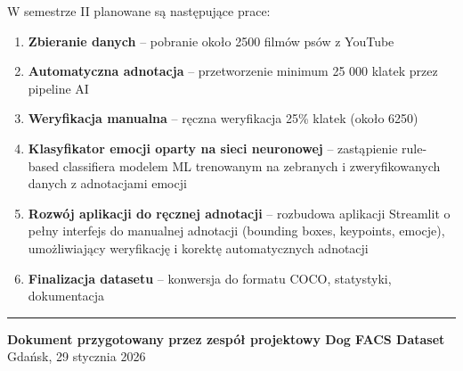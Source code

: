 \documentclass[12pt,a4paper]{article}
\begin{document}
W semestrze II planowane są następujące prace:

\begin{enumerate}
    \item \textbf{Zbieranie danych} -- pobranie około 2500 filmów psów z YouTube
    \item \textbf{Automatyczna adnotacja} -- przetworzenie minimum 25 000 klatek przez pipeline AI
    \item \textbf{Weryfikacja manualna} -- ręczna weryfikacja 25\% klatek (około 6250)
    \item \textbf{Klasyfikator emocji oparty na sieci neuronowej} -- zastąpienie rule-based classifiera modelem ML trenowanym na zebranych i zweryfikowanych danych z adnotacjami emocji
    \item \textbf{Rozwój aplikacji do ręcznej adnotacji} -- rozbudowa aplikacji Streamlit o pełny interfejs do manualnej adnotacji (bounding boxes, keypoints, emocje), umożliwiający weryfikację i korektę automatycznych adnotacji
    \item \textbf{Finalizacja datasetu} -- konwersja do formatu COCO, statystyki, dokumentacja
\end{enumerate}

\vspace{1cm}
\hrule
\vspace{0.5cm}

\textbf{Dokument przygotowany przez zespół projektowy Dog FACS Dataset}\\
Gdańsk, 29 stycznia 2026
\end{document}
